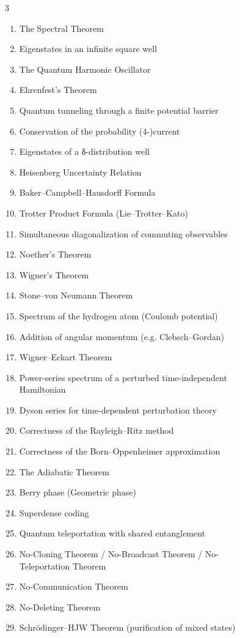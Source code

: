 \begin{figure}
\begin{multicols}{3}
{\fontsize{5}{5}\selectfont
\begin{enumerate}
\item The Spectral Theorem
\item Eigenstates in an infinite square well
\item The Quantum Harmonic Oscillator
\item Ehrenfest’s Theorem
\item Quantum tunneling through a finite potential barrier
\item Conservation of the probability (4-)current
\item Eigenstates of a δ-distribution well
\item Heisenberg Uncertainty Relation
\item Baker–Campbell–Hausdorff Formula
\item Trotter Product Formula (Lie–Trotter–Kato)
\item Simultaneous diagonalization of commuting observables
\item Noether’s Theorem
\item Wigner’s Theorem
\item Stone–von Neumann Theorem
\item Spectrum of the hydrogen atom (Coulomb potential)
\item Addition of angular momentum (e.g. Clebsch–Gordan)
\item Wigner–Eckart Theorem
\item Power-series spectrum of a perturbed time-independent Hamiltonian
\item Dyson series for time-dependent perturbation theory
\item Correctness of the Rayleigh–Ritz method
\item Correctness of the Born–Oppenheimer approximation
\item The Adiabatic Theorem
\item Berry phase (Geometric phase)
\item Superdense coding
\item Quantum teleportation with shared entanglement
\item No-Cloning Theorem / No-Broadcast Theorem / No-Teleportation Theorem
\item No-Communication Theorem
\item No-Deleting Theorem
\item Schrödinger–HJW Theorem (purification of mixed states)

\end{enumerate}}
\end{multicols}
\end{figure}
